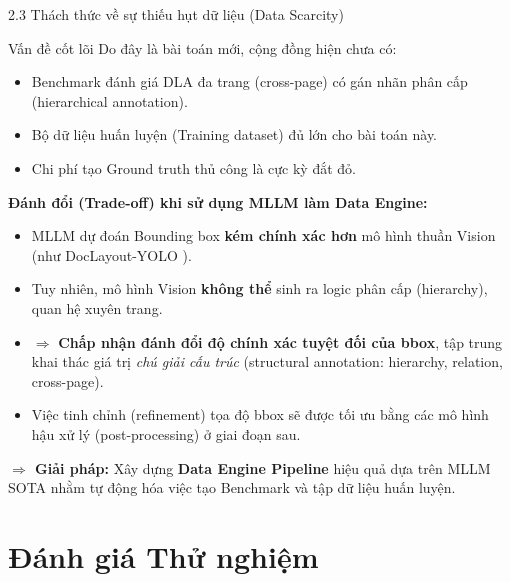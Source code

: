 \documentclass[aspectratio=1610,8pt]{beamer}
\begin{document}
\begin{frame}{2.3 \; Thách thức về sự thiếu hụt dữ liệu (Data Scarcity)}
    \begin{alertblock}{Vấn đề cốt lõi}
        Do đây là bài toán mới, cộng đồng hiện chưa có:
        \begin{itemize}
            \item Benchmark đánh giá DLA đa trang (cross-page) có gán nhãn phân cấp (hierarchical annotation).
            \item Bộ dữ liệu huấn luyện (Training dataset) đủ lớn cho bài toán này.
            \item Chi phí tạo Ground truth thủ công là cực kỳ đắt đỏ.
        \end{itemize}
    \end{alertblock}

    \vspace{0.4em}
    \textbf{Đánh đổi (Trade-off) khi sử dụng MLLM làm Data Engine:}
    \begin{itemize}
        \item MLLM dự đoán Bounding box \textbf{kém chính xác hơn} mô hình thuần Vision (như DocLayout-YOLO \cite{dla_2024_arxiv_doclayout_yolo_enhancing_document_layout_analysis_through_diverse_syn}).
        \item Tuy nhiên, mô hình Vision \textbf{không thể} sinh ra logic phân cấp (hierarchy), quan hệ xuyên trang.
        \item $\Rightarrow$ \textbf{Chấp nhận đánh đổi độ chính xác tuyệt đối của bbox}, tập trung khai thác giá trị \textit{chú giải cấu trúc} (structural annotation: hierarchy, relation, cross-page).
        \item Việc tinh chỉnh (refinement) tọa độ bbox sẽ được tối ưu bằng các mô hình hậu xử lý (post-processing) ở giai đoạn sau.
    \end{itemize}

    \vspace{0.3em}
    \textbf{$\Rightarrow$ Giải pháp:} Xây dựng \textbf{Data Engine Pipeline} hiệu quả dựa trên MLLM SOTA nhằm tự động hóa việc tạo Benchmark và tập dữ liệu huấn luyện.
\end{frame}

\section{Đánh giá Thử nghiệm}
\end{document}

